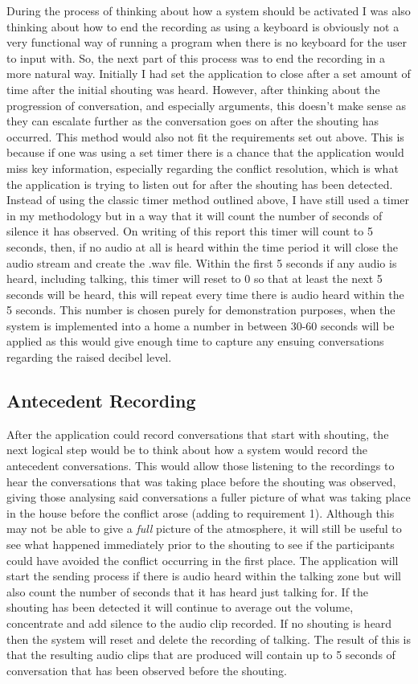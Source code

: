 \documentclass[a4paper,11pt]{report}
\begin{document}
During the process of thinking about how a system should be activated I was also thinking about how to end the recording as using a keyboard is obviously not a very functional way of running a program when there is no keyboard for the user to input with. So, the next part of this process was to end the recording in a more natural way. Initially I had set the application to close after a set amount of time after the initial shouting was heard. However, after thinking about the progression of conversation, and especially arguments, this doesn’t make sense as they can escalate further as the conversation goes on after the shouting has occurred. This method would also not fit the requirements set out above. This is because if one was using a set timer there is a chance that the application would miss key information, especially regarding the conflict resolution, which is what the application is trying to listen out for after the shouting has been detected. Instead of using the classic timer method outlined above, I have still used a timer in my methodology but in a way that it will count the number of seconds of silence it has observed. On writing of this report this timer will count to 5 seconds, then, if no audio at all is heard within the time period it will close the audio stream and create the .wav file. Within the first 5 seconds if any audio is heard, including talking, this timer will reset to 0 so that at least the next 5 seconds will be heard, this will repeat every time there is audio heard within the 5 seconds. This number is chosen purely for demonstration purposes, when the system is implemented into a home a number in between 30-60 seconds will be applied as this would give enough time to capture any ensuing conversations regarding the raised decibel level. 

\subsection{Antecedent Recording}
After the application could record conversations that start with shouting, the next logical step would be to think about how a system would record the antecedent conversations. This would allow those listening to the recordings to hear the conversations that was taking place before the shouting was observed, giving those analysing said conversations a fuller picture of what was taking place in the house before the conflict arose (adding to requirement 1). Although this may not be able to give a \textit{full} picture of the atmosphere, it will still be useful to see what happened immediately prior to the shouting to see if the participants could have avoided the conflict occurring in the first place. The application will start the sending process if there is audio heard within the talking zone but will also count the number of seconds that it has heard just talking for. If the shouting has been detected it will continue to average out the volume, concentrate and add silence to the audio clip recorded. If no shouting is heard then the system will reset and delete the recording of talking. The result of this is that the resulting audio clips that are produced will contain up to 5 seconds of conversation that has been observed before the shouting. 
\end{document}
